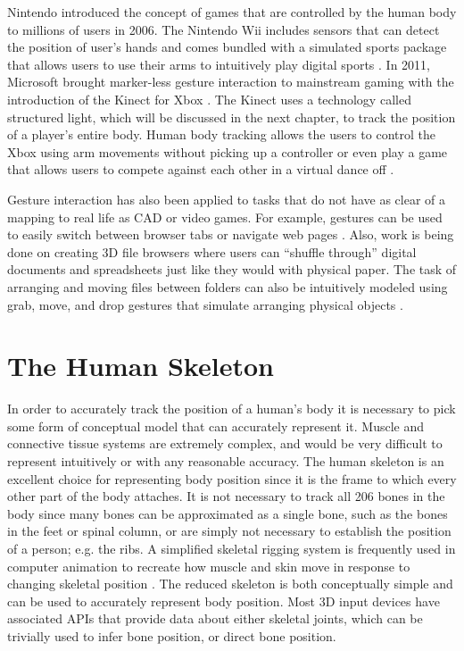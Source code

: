 Nintendo introduced the concept of games that are controlled by the human body to millions of users in 2006. The Nintendo Wii includes sensors that can detect the position of user's hands and comes bundled with a simulated sports package that allows users to use their arms to intuitively play digital sports \cite{pasch2009movement}. In 2011, Microsoft brought marker-less gesture interaction to mainstream gaming with the introduction of the Kinect for Xbox \cite{kinectlaunch}. The Kinect uses a technology called structured light, which will be discussed in the next chapter, to track the position of a player's entire body. Human body tracking allows the users to control the Xbox using arm movements without picking up a controller or even play a game that allows users to compete against each other in a virtual dance off \cite{zhang2012microsoft}.

Gesture interaction has also been applied to tasks that do not have as clear of a mapping to real life as CAD or video games. For example, gestures can be used to easily switch between browser tabs or navigate web pages \cite{moyle2003design}. Also, work is being done on creating 3D file browsers where users can “shuffle through” digital documents and spreadsheets just like they would with physical paper. The task of arranging and moving files between folders can also be intuitively modeled using grab, move, and drop gestures that simulate arranging physical objects \cite{dnd_interface}.

\section{The Human Skeleton}

In order to accurately track the position of a human's body it is necessary to pick some form of conceptual model that can accurately represent it. Muscle and connective tissue systems are extremely complex, and would be very difficult to represent intuitively or with any reasonable accuracy. The human skeleton is an excellent choice for representing body position since it is the frame to which every other part of the body attaches. It is not necessary to track all 206 bones in the body since many bones can be approximated as a single bone, such as the bones in the feet or spinal column, or are simply not necessary to establish the position of a person; e.g. the ribs. A simplified skeletal rigging system is frequently used in computer animation to recreate how muscle and skin move in response to changing skeletal position \cite{parent2012computer}. The reduced skeleton is both conceptually simple and can be used to accurately represent body position. Most 3D input devices have associated APIs that provide data about either skeletal joints, which can be trivially used to infer bone position, or direct bone position.

